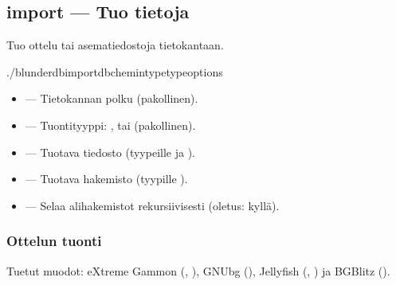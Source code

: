 \documentclass[letterpaper,10pt,finnish]{sphinxmanual}
\begin{document}
\subsection{import — Tuo tietoja}
\label{\detokenize{cli:import-importer-des-donnees}}
\sphinxAtStartPar
Tuo ottelu\sphinxhyphen{} tai asematiedostoja tietokantaan.

\begin{sphinxVerbatim}[commandchars=\\\{\}]
./blunderdbimport\PYGZhy{}\PYGZhy{}db\PYGZlt{}chemin\PYGZgt{}\PYGZhy{}\PYGZhy{}type\PYGZlt{}type\PYGZgt{}\PYG{o}{[}options\PYG{o}{]}
\end{sphinxVerbatim}

\sphinxAtStartPar
{}
\begin{itemize}
\item {} 
\sphinxAtStartPar
{} — Tietokannan polku (pakollinen).

\item {} 
\sphinxAtStartPar
{} — Tuontityyppi: ,  tai  (pakollinen).

\item {} 
\sphinxAtStartPar
{} — Tuotava tiedosto (tyypeille  ja ).

\item {} 
\sphinxAtStartPar
{} — Tuotava hakemisto (tyypille ).

\item {} 
\sphinxAtStartPar
{} — Selaa alihakemistot rekursiivisesti (oletus: kyllä).

\end{itemize}


\subsubsection{Ottelun tuonti}
\label{\detokenize{cli:import-d-un-match}}
\sphinxAtStartPar
Tuetut muodot: eXtreme Gammon (, ), GNUbg (), Jellyfish (, ) ja BGBlitz ().
\end{document}
